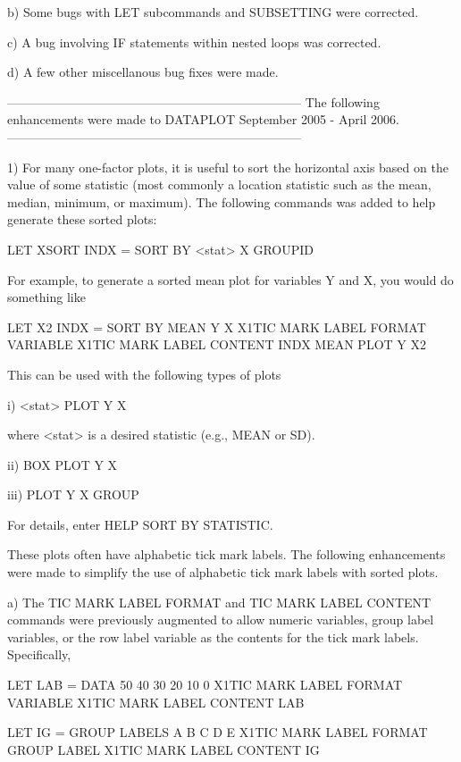 {    b) Some bugs with LET subcommands and SUBSETTING were
       corrected.

    c) A bug involving IF statements within nested loops was
       corrected.

    d) A few other miscellanous bug fixes were made.

-----------------------------------------------------------------------
The following enhancements were made to DATAPLOT
September 2005 - April 2006.
-----------------------------------------------------------------------

 1) For many one-factor plots, it is useful to sort the horizontal
    axis based on the value of some statistic (most commonly a
    location statistic such as the mean, median, minimum, or
    maximum).  The following commands was added to help generate
    these sorted plots:

       LET XSORT INDX = SORT BY <stat> X GROUPID

    For example, to generate a sorted mean plot for variables
    Y and X, you would do something like

      LET X2 INDX = SORT BY MEAN Y X
      X1TIC MARK LABEL FORMAT VARIABLE
      X1TIC MARK LABEL CONTENT INDX
      MEAN PLOT Y X2

    This can be used with the following types of plots

        i) <stat> PLOT Y X

           where <stat> is a desired statistic (e.g., MEAN or
           SD).

       ii) BOX PLOT Y X

      iii) PLOT Y X GROUP

    For details, enter HELP SORT BY STATISTIC.

    These plots often have alphabetic tick mark labels.  The
    following enhancements were made to simplify the use
    of alphabetic tick mark labels with sorted plots.

    a) The TIC MARK LABEL FORMAT and TIC MARK LABEL CONTENT
       commands were previously augmented to allow numeric
       variables, group label variables, or the row label
       variable as the contents for the tick mark labels.
       Specifically,

          LET LAB = DATA 50 40 30 20 10 0
          X1TIC MARK LABEL FORMAT VARIABLE
          X1TIC MARK LABEL CONTENT LAB

          LET IG = GROUP LABELS A B C D E
          X1TIC MARK LABEL FORMAT GROUP LABEL
          X1TIC MARK LABEL CONTENT IG

}
